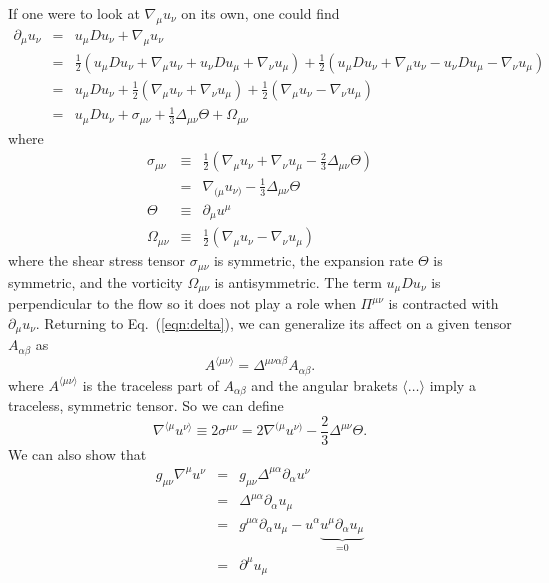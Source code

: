 \documentclass[aps,article]{revtex4}
\begin{document}
If one were to look at $\nabla_{\mu}u_{\nu}$ on its own, one could find
\begin{eqnarray}
\partial_{\mu}u_{\nu}&=&u_{\mu}Du_{\nu}+\nabla_{\mu}u_{\nu}\nonumber\\
&=&\frac{1}{2}\left(u_{\mu}Du_{\nu}+\nabla_{\mu}u_{\nu}+u_{\nu}Du_{\mu}+\nabla_{\nu}u_{\mu}\right)+\frac{1}{2}\left(u_{\mu}Du_{\nu}+\nabla_{\mu}u_{\nu}-u_{\nu}Du_{\mu}-\nabla_{\nu}u_{\mu}\right)\nonumber\\
&=&u_{\mu}Du_{\nu}+\frac{1}{2}\left(\nabla_{\mu}u_{\nu}+\nabla_{\nu}u_{\mu}\right)+\frac{1}{2}\left(\nabla_{\mu}u_{\nu}-\nabla_{\nu}u_{\mu}\right)\nonumber\\
&=&u_{\mu}Du_{\nu}+\sigma_{\mu\nu}+\frac{1}{3}\Delta_{\mu\nu}\Theta+\Omega_{\mu\nu}
\end{eqnarray}
where
\begin{eqnarray}
\sigma_{\mu\nu}&\equiv&\frac{1}{2}\left(\nabla_{\mu}u_{\nu}+\nabla_{\nu}u_{\mu}-\frac{2}{3}\Delta_{\mu\nu}\Theta\right)\nonumber\\
&=&\nabla_{(\mu}u_{\nu)}-\frac{1}{3}\Delta_{\mu\nu}\Theta\label{eqn:sigmdef}\\
\Theta&\equiv&\partial_{\mu}u^{\mu}\\
\Omega_{\mu\nu}&\equiv&\frac{1}{2}\left(\nabla_{\mu}u_{\nu}-\nabla_{\nu}u_{\mu}\right)
\end{eqnarray}
where the shear stress tensor $\sigma_{\mu\nu}$ is symmetric, the expansion rate $\Theta$ is symmetric, and the vorticity $\Omega_{\mu\nu}$ is antisymmetric. The term $u_{\mu}Du_{\nu}$ is perpendicular to the flow so it does not play a role when $\Pi^{\mu\nu}$ is contracted with $\partial_{\mu}u_{\nu}$.
Returning to Eq.\ (\ref{eqn:delta}), we can generalize its affect on a given tensor $A_{\alpha\beta}$ as
\begin{equation}\label{eqn:tracelessproj}
A^{\langle\mu\nu\rangle}= \Delta^{\mu\nu\alpha\beta}A_{\alpha\beta}.
\end{equation} 
where $A^{\langle\mu\nu\rangle}$ is the traceless part of $A_{\alpha\beta}$ and the angular brakets $\langle \dots\rangle$ imply a traceless, symmetric tensor.
So we can define
\begin{equation}\label{eqn:nabperp}
\nabla^{\langle\mu}u^{\nu\rangle}\equiv2\sigma^{\mu\nu}=2\nabla^{(\mu}u^{\nu)}-\frac{2}{3}\Delta^{\mu\nu}\Theta.
\end{equation}
We can also show that
\begin{eqnarray}
g_{\mu\nu}\nabla^{\mu}u^{\nu}&=&g_{\mu\nu}\Delta^{\mu\alpha}\partial_{\alpha}u^{\nu}\nonumber\\
&=&\Delta^{\mu\alpha}\partial_{\alpha}u_{\mu}\nonumber\\
&=&g^{\mu\alpha}\partial_{\alpha}u_{\mu}-u^{\alpha}\underbrace{u^{\mu}\partial_{\alpha}u_{\mu}}_\textrm{=0}\nonumber\\
&=&\partial^{\mu}u_{\mu}
\end{eqnarray}
\end{document}
